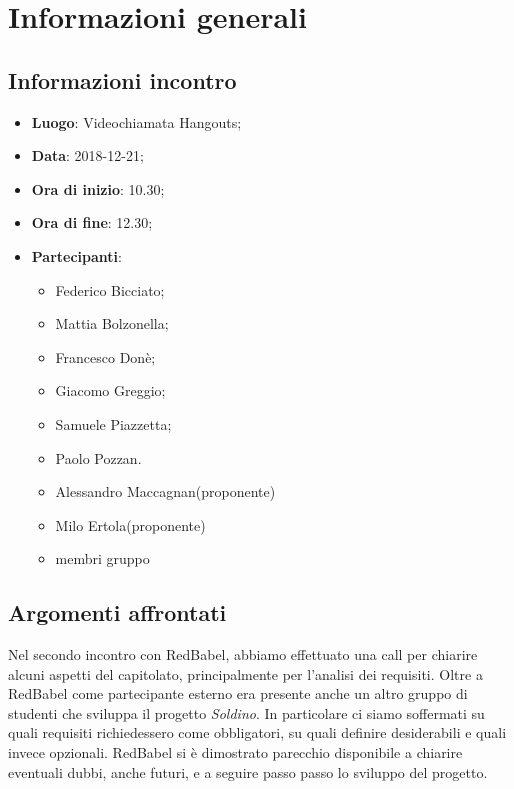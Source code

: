 \section{Informazioni generali}

\subsection{Informazioni incontro}
\begin{itemize}
\item \textbf{Luogo}: Videochiamata Hangouts;
\item \textbf{Data}: 2018-12-21;
\item \textbf{Ora di inizio}: 10.30;
\item \textbf{Ora di fine}: 12.30;
\item \textbf{Partecipanti}:
\begin{itemize}
	\item Federico Bicciato;
	\item Mattia Bolzonella;
	\item Francesco Donè;
	\item Giacomo Greggio;
	\item Samuele Piazzetta;
	\item Paolo Pozzan.
	\item Alessandro Maccagnan(proponente)
	\item Milo Ertola(proponente)
	\item membri gruppo 
\end{itemize}
\end{itemize}

\subsection{Argomenti affrontati}
Nel secondo incontro con RedBabel, abbiamo effettuato una call per chiarire alcuni aspetti del capitolato, principalmente per l'analisi dei requisiti.
Oltre a RedBabel come partecipante esterno era presente anche un altro gruppo di studenti che sviluppa il progetto \textit{Soldino}.
In particolare ci siamo soffermati su quali requisiti richiedessero come obbligatori, su quali definire desiderabili e quali invece opzionali.
RedBabel si è dimostrato parecchio disponibile a chiarire eventuali dubbi, anche futuri, e a seguire passo passo lo sviluppo del progetto.
